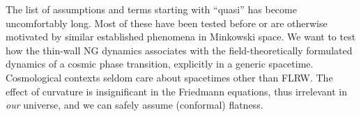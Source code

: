 






The list of assumptions and terms starting with ``quasi'' has become uncomfortably long. Most of these have been tested before or are otherwise motivated by similar established phenomena in Minkowski space. %
We want to test how the thin-wall NG dynamics associates with the field-theoretically formulated dynamics of a cosmic phase transition, explicitly in a generic spacetime. Cosmological contexts seldom care about spacetimes other than FLRW. The effect of curvature is insignificant in the Friedmann equations, thus irrelevant in \emph{our} universe, and we can safely assume (conformal) flatness. 























